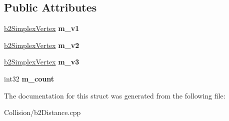 \subsection*{Public Attributes}
\begin{DoxyCompactItemize}
\item 
\mbox{\label{structb2Simplex_a974d030fe572112e6d5212520586eb13}} 
\mbox{\hyperlink{structb2SimplexVertex}{b2\+Simplex\+Vertex}} {\bfseries m\+\_\+v1}
\item 
\mbox{\label{structb2Simplex_a1732c0f9d63e7cdbd405e7a7b2c7b7cb}} 
\mbox{\hyperlink{structb2SimplexVertex}{b2\+Simplex\+Vertex}} {\bfseries m\+\_\+v2}
\item 
\mbox{\label{structb2Simplex_a42ede9ec641aea34e51baf1b43e9ea07}} 
\mbox{\hyperlink{structb2SimplexVertex}{b2\+Simplex\+Vertex}} {\bfseries m\+\_\+v3}
\item 
\mbox{\label{structb2Simplex_ad11c352a25ee324f438515fb8028bd23}} 
int32 {\bfseries m\+\_\+count}
\end{DoxyCompactItemize}


The documentation for this struct was generated from the following file\+:\begin{DoxyCompactItemize}
\item 
Collision/b2\+Distance.\+cpp\end{DoxyCompactItemize}
